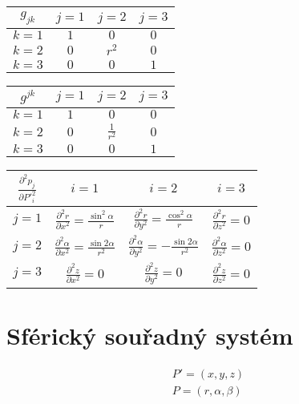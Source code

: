 \begin{tabular}{| c || c | c | c |}
\hline
\(g_{jk}\) & \(j=1\) & \(j=2\) & \(j=3\) \\
\hline
\hline
\(k=1\) & \(1\) & \(0\) & \(0\) \\
\hline
\(k=2\) & \(0\) & \(r^2\) & \(0\) \\
\hline
\(k=3\) & \(0\) & \(0\) & \(1\) \\
\hline
\end{tabular}

\begin{tabular}{| c || c | c | c |}
\hline
\(g^{jk}\) & \(j=1\) & \(j=2\) & \(j=3\) \\
\hline
\hline
\(k=1\) & \(1\) & \(0\) & \(0\) \\
\hline
\(k=2\) & \(0\) & \(\frac{1}{r^2}\) & \(0\) \\
\hline
\(k=3\) & \(0\) & \(0\) & \(1\) \\
\hline
\end{tabular}

\begin{tabular}{| c || c | c | c |}
\hline
\(\frac{\partial^2 p_j}{\partial P'^2_i}\) & \(i=1\) & \(i=2\) & \(i=3\) \\
\hline
\hline
\(j=1\) & \(\frac{\partial^2 r}{\partial x^2} = \frac{\sin^2 \alpha}{r}\) & \(\frac{\partial^2 r}{\partial y^2} = \frac{\cos^2 \alpha}{r}\) & \(\frac{\partial^2 r}{\partial z^2} = 0\) \\
\hline
\(j=2\) & \(\frac{\partial^2 \alpha}{\partial x^2} = \frac{\sin 2 \alpha}{r^2}\) & \(\frac{\partial^2 \alpha}{\partial y^2} = -\frac{\sin 2\alpha}{r^2}\) & \(\frac{\partial^2 \alpha}{\partial z^2} = 0\) \\
\hline
\(j=3\) & \(\frac{\partial^2 z}{\partial x^2} = 0\) & \(\frac{\partial^2 z}{\partial y^2} = 0\) & \(\frac{\partial^2 z}{\partial z^2} = 0\) \\
\hline
\end{tabular}


\section{Sférický souřadný systém}

\begin{equation}
\begin{split}
P' = (x, y, z) \\
P = (r, \alpha, \beta)
\end{split}
\end{equation}

